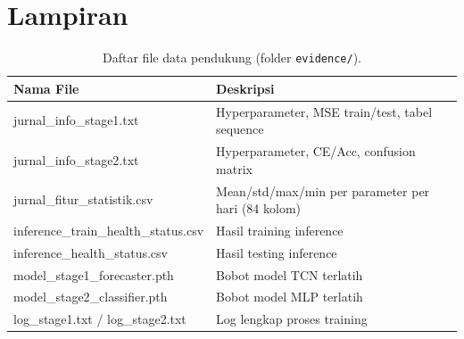 \documentclass[12pt,a4paper]{report}
\begin{document}
\chapter*{Lampiran}
\begin{table}[H]
    \centering
    \small
    \caption{Daftar file data pendukung (folder \texttt{evidence/}).}
    \begin{tabular}{ll}
        \toprule
        \textbf{Nama File} & \textbf{Deskripsi} \\
        \midrule
        jurnal\_info\_stage1.txt & Hyperparameter, MSE train/test, tabel sequence \\
        jurnal\_info\_stage2.txt & Hyperparameter, CE/Acc, confusion matrix \\
        jurnal\_fitur\_statistik.csv & Mean/std/max/min per parameter per hari (84 kolom) \\
        inference\_train\_health\_status.csv & Hasil training inference \\
        inference\_health\_status.csv & Hasil testing inference \\
        model\_stage1\_forecaster.pth & Bobot model TCN terlatih \\
        model\_stage2\_classifier.pth & Bobot model MLP terlatih \\
        log\_stage1.txt / log\_stage2.txt & Log lengkap proses training \\
        \bottomrule
    \end{tabular}
\end{table}
\end{document}
